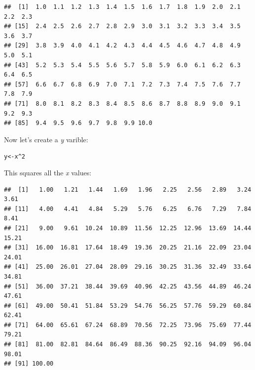 \documentclass{article}\usepackage[]{graphicx}\usepackage[]{color}
\makeatletter
\newcommand{\hlnum}[1]{\textcolor[rgb]{0.686,0.059,0.569}{#1}}%
\newcommand{\hlopt}[1]{\textcolor[rgb]{0,0,0}{#1}}%
\newcommand{\hlstd}[1]{\textcolor[rgb]{0.345,0.345,0.345}{#1}}%
\newcommand{\hlkwb}[1]{\textcolor[rgb]{0.69,0.353,0.396}{#1}}%
\newenvironment{kframe}{%
 \def\at@end@of@kframe{}%
 \ifinner\ifhmode%
  \def\at@end@of@kframe{\end{minipage}}%
  \begin{minipage}{\columnwidth}%
 \fi\fi%
 \def\FrameCommand##1{\hskip\@totalleftmargin \hskip-\fboxsep
 \colorbox{shadecolor}{##1}\hskip-\fboxsep
     \hskip-\linewidth \hskip-\@totalleftmargin \hskip\columnwidth}%
 \MakeFramed {\advance\hsize-\width
   \@totalleftmargin\z@ \linewidth\hsize
   \@setminipage}}%
 {\par\unskip\endMakeFramed%
 \at@end@of@kframe}
\newenvironment{knitrout}{}{} %
\makeatother
\begin{document}
\begin{knitrout}
\color{fgcolor}\begin{kframe}
\begin{verbatim}
##  [1]  1.0  1.1  1.2  1.3  1.4  1.5  1.6  1.7  1.8  1.9  2.0  2.1  2.2  2.3
## [15]  2.4  2.5  2.6  2.7  2.8  2.9  3.0  3.1  3.2  3.3  3.4  3.5  3.6  3.7
## [29]  3.8  3.9  4.0  4.1  4.2  4.3  4.4  4.5  4.6  4.7  4.8  4.9  5.0  5.1
## [43]  5.2  5.3  5.4  5.5  5.6  5.7  5.8  5.9  6.0  6.1  6.2  6.3  6.4  6.5
## [57]  6.6  6.7  6.8  6.9  7.0  7.1  7.2  7.3  7.4  7.5  7.6  7.7  7.8  7.9
## [71]  8.0  8.1  8.2  8.3  8.4  8.5  8.6  8.7  8.8  8.9  9.0  9.1  9.2  9.3
## [85]  9.4  9.5  9.6  9.7  9.8  9.9 10.0
\end{verbatim}
\end{kframe}
\end{knitrout}

\noindent Now let's create a \textit{y} varible:

\begin{knitrout}
\color{fgcolor}\begin{kframe}
\begin{alltt}
\hlstd{y} \hlkwb{<-} \hlstd{x}\hlopt{^}\hlnum{2}
\end{alltt}
\end{kframe}
\end{knitrout}

\noindent This squares all the \textit{x} values:

\begin{knitrout}
\color{fgcolor}\begin{kframe}
\begin{verbatim}
##  [1]   1.00   1.21   1.44   1.69   1.96   2.25   2.56   2.89   3.24   3.61
## [11]   4.00   4.41   4.84   5.29   5.76   6.25   6.76   7.29   7.84   8.41
## [21]   9.00   9.61  10.24  10.89  11.56  12.25  12.96  13.69  14.44  15.21
## [31]  16.00  16.81  17.64  18.49  19.36  20.25  21.16  22.09  23.04  24.01
## [41]  25.00  26.01  27.04  28.09  29.16  30.25  31.36  32.49  33.64  34.81
## [51]  36.00  37.21  38.44  39.69  40.96  42.25  43.56  44.89  46.24  47.61
## [61]  49.00  50.41  51.84  53.29  54.76  56.25  57.76  59.29  60.84  62.41
## [71]  64.00  65.61  67.24  68.89  70.56  72.25  73.96  75.69  77.44  79.21
## [81]  81.00  82.81  84.64  86.49  88.36  90.25  92.16  94.09  96.04  98.01
## [91] 100.00
\end{verbatim}
\end{kframe}
\end{knitrout}
\end{document}
